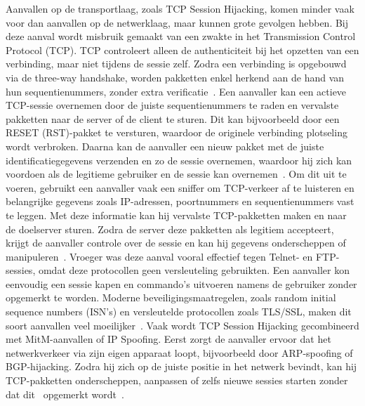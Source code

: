 Aanvallen op de transportlaag, zoals TCP Session Hijacking, komen minder vaak voor dan aanvallen op de netwerklaag, maar kunnen grote gevolgen hebben. Bij deze aanval wordt misbruik gemaakt van een zwakte in het Transmission Control Protocol (TCP). TCP controleert alleen de authenticiteit bij het opzetten van een verbinding, maar niet tijdens de sessie zelf. Zodra een verbinding is opgebouwd via de three-way handshake, worden pakketten enkel herkend aan de hand van hun sequentienummers, zonder extra verificatie~\autocite{chen2020}.
Een aanvaller kan een actieve TCP-sessie overnemen door de juiste sequentienummers te raden en vervalste pakketten naar de server of de client te sturen. Dit kan bijvoorbeeld door een RESET (RST)-pakket te versturen, waardoor de originele verbinding plotseling wordt verbroken. Daarna kan de aanvaller een nieuw pakket met de juiste identificatiegegevens verzenden en zo de sessie overnemen, waardoor hij zich kan voordoen als de legitieme gebruiker en de sessie kan overnemen~\autocite{chen2020}.
Om dit uit te voeren, gebruikt een aanvaller vaak een sniffer om TCP-verkeer af te luisteren en belangrijke gegevens zoals IP-adressen, poortnummers en sequentienummers vast te leggen. Met deze informatie kan hij vervalste TCP-pakketten maken en naar de doelserver sturen. Zodra de server deze pakketten als legitiem accepteert, krijgt de aanvaller controle over de sessie en kan hij gegevens onderscheppen of manipuleren~\autocite{chen2020}.
Vroeger was deze aanval vooral effectief tegen Telnet- en FTP-sessies, omdat deze protocollen geen versleuteling gebruikten. Een aanvaller kon eenvoudig een sessie kapen en commando’s uitvoeren namens de gebruiker zonder opgemerkt te worden. Moderne beveiligingsmaatregelen, zoals random initial sequence numbers (ISN’s) en versleutelde protocollen zoals TLS/SSL, maken dit soort aanvallen veel moeilijker~\autocite{chen2020}.
Vaak wordt TCP Session Hijacking gecombineerd met MitM-aanvallen of IP Spoofing. Eerst zorgt de aanvaller ervoor dat het netwerkverkeer via zijn eigen apparaat loopt, bijvoorbeeld door ARP-spoofing of BGP-hijacking. Zodra hij zich op de juiste positie in het netwerk bevindt, kan hij TCP-pakketten onderscheppen, aanpassen of zelfs nieuwe sessies starten zonder dat dit  opgemerkt wordt~\autocite{chen2020}.

\subsection{}

